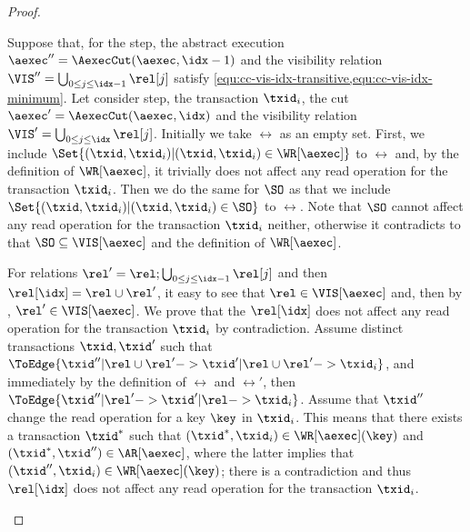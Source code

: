 \begin{toappendix}
\begin{proof}
\begin{enumerate}
    Suppose that, for the  step,
    the abstract execution \( \aexec'' =  \AexecCut(\aexec, \idx - 1) \)
    and the visibility relation \( \VIS'' = \bigcup_{0 \leq j \leq \idx-1 } \rel[j] \) 
    satisfy \cref{equ:cc-vis-idx-transitive,equ:cc-vis-idx-minimum}.
    Let consider \Th{\idx} step, the transaction \( \txid_i \),
    the cut \( \aexec' =  \AexecCut(\aexec, \idx) \)
    and the visibility relation \( \VIS' = \bigcup_{0 \leq j \leq \idx } \rel[j] \).
    Initially we take \( \rel \) as an empty set.
    First, we include \( \Set{(\txid,\txid_i) | (\txid,\txid_i) \in \WR[\aexec]} \) to \( \rel \)
    and, by the definition of \( \WR[\aexec]\), 
    it trivially does not affect any read operation for the transaction \( \txid_i \).
    Then we do the same for \( \SO \) as that 
    we include \( \Set{(\txid,\txid_i) | (\txid,\txid_i) \in \SO} \) to \( \rel \).
    Note that \( \SO \) cannot affect any read operation for the transaction \( \txid_i \) neither,
    otherwise it contradicts to that \( \SO \subseteq \VIS[\aexec] \) and the definition of \( \WR[\aexec] \).

    For relations \( \rel' = \rel ; \bigcup_{0 \leq j \leq \idx-1 } \rel[j] \) and then \( \rel[\idx] = \rel \cup \rel' \),
    it easy to see that \( \rel \in \VIS[\aexec]\) and, then by \ih, \( \rel' \in \VIS[\aexec] \).
    We prove that the \( \rel[\idx] \) does not affect any read operation for the transaction \( \txid_i \)
    by contradiction.
    Assume distinct transactions \( \txid,\txid' \) such that
    \( \ToEdge{\txid'' | \rel \cup \rel' -> \txid' | \rel \cup \rel' -> \txid_i } \),
    and immediately  by the definition of \( \rel \) and \( \rel' \),
    then \( \ToEdge{\txid'' | \rel' -> \txid' | \rel -> \txid_i } \).
    Assume that \( \txid'' \) change the read operation for a key \( \key \) in \( \txid_i \).
    This means that there exists a transaction \( \txid^* \) such that
    \( (\txid^*,\txid_i) \in \WR[\aexec](\key)\) and \( (\txid^*,\txid'') \in \AR[\aexec] \),
    where the latter implies that \( (\txid'',\txid_i) \in \WR[\aexec](\key) \);
    there is a contradiction and thus 
    \( \rel[\idx] \) does not affect any read operation for the transaction \( \txid_i \).


\end{enumerate}
\end{proof}
\end{toappendix}
